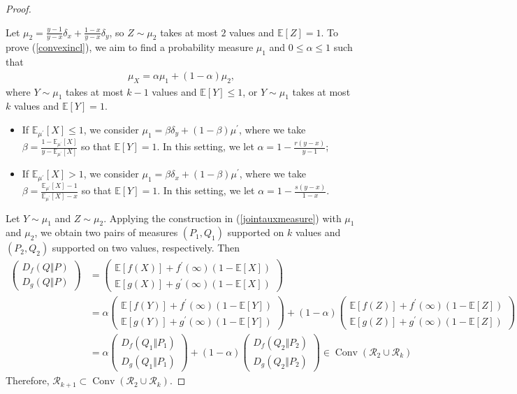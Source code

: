 \documentclass{article}
\numberwithin{equation}{section}
\newcommand{\E}{\mathbb{E}}
\renewcommand{\cal}{\mathcal}
\DeclareMathOperator{\conv}{Conv}
\theoremstyle{plain}
\theoremstyle{definition}
\begin{document}
\begin{proof}
\begin{itemize}
Let $\mu_2=\frac{y-1}{y-x}\delta_x+\frac{1-x}{y-x}\delta_y$, so $Z\sim\mu_2$ takes at most $2$ values and $\E[Z]=1$. To prove (\ref{convexincl}), we aim to find a probability measure $\mu_1$ and $0\leq\alpha\leq 1$ such that
\begin{align*}
	\mu_X=\alpha\mu_1+(1-\alpha)\mu_2,
\end{align*}
where $Y\sim\mu_1$ takes at most $k-1$ values and $\E[Y]\leq 1$, or $Y\sim\mu_1$ takes at most $k$ values and $\E[Y]= 1$.
\begin{itemize}
	\item If $\E_{\mu^\prime}[X]\leq 1$, we consider $\mu_1=\beta\delta_y+(1-\beta)\mu^\prime$, where we take $\beta=\frac{1-\E_{\mu^\prime}[X]}{y-\E_{\mu^\prime}[X]}$ so that $\E[Y]=1$. In this setting, we let $\alpha=1-\frac{r(y-x)}{y-1}$;
	\item If $\E_{\mu^\prime}[X]> 1$, we consider $\mu_1=\beta\delta_x+(1-\beta)\mu^\prime$, where we take $\beta=\frac{\E_{\mu^\prime}[X]-1}{\E_{\mu^\prime}[X]-x}$ so that $\E[Y]=1$. In this setting, we let $\alpha=1-\frac{s(y-x)}{1-x}$.
\end{itemize}
\end{itemize}
Let $Y\sim\mu_1$ and $Z\sim\mu_2$.  Applying the construction in (\ref{jointauxmeasure}) with $\mu_1$ and $\mu_2$, we obtain two pairs of measures $(P_1,Q_1)$ supported on $k$ values and $(P_2,Q_2)$ supported on two values, respectively. Then 
\begin{align*}
\begin{pmatrix}
	D_f(Q\Vert P)\\ D_g(Q\Vert P)
\end{pmatrix}&=\begin{pmatrix}
	\E[f(X)]+f^\prime(\infty)(1-\E[X])\\
	\E[g(X)]+g^\prime(\infty)(1-\E[X])
\end{pmatrix}\\
&=\alpha\begin{pmatrix}
	\E[f(Y)]+f^\prime(\infty)(1-\E[Y])\\
	\E[g(Y)]+g^\prime(\infty)(1-\E[Y])
\end{pmatrix}+(1-\alpha)\begin{pmatrix}
\E[f(Z)]+f^\prime(\infty)(1-\E[Z])\\
\E[g(Z)]+g^\prime(\infty)(1-\E[Z])
\end{pmatrix}\\
&=\alpha\begin{pmatrix}
	D_f(Q_1\Vert P_1)\\ D_g(Q_1\Vert P_1)
\end{pmatrix}+(1-\alpha)\begin{pmatrix}
D_f(Q_2\Vert P_2)\\ D_g(Q_2\Vert P_2)
\end{pmatrix}\in \conv(\cal{R}_2\cup\cal{R}_k)
\end{align*}
Therefore, $\cal{R}_{k+1}\subset\conv(\cal{R}_2\cup\cal{R}_k)$.
\end{proof}
\end{document}
